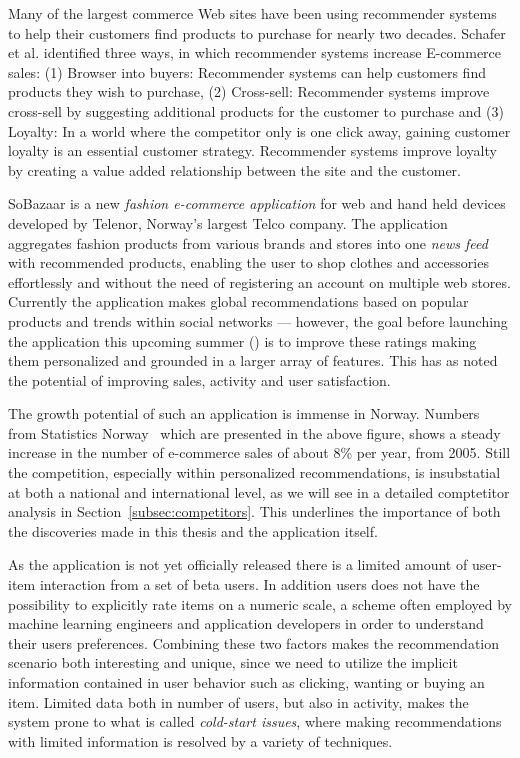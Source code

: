 Many of the largest commerce Web sites have been using recommender systems to
help their customers find products to purchase for nearly two decades.
Schafer et al. \cite{Schafer1999} identified three ways, in which recommender
systems increase E-commerce sales: (1) Browser into buyers: Recommender systems
can help customers find products they wish to purchase, (2) Cross-sell:
Recommender systems improve cross-sell by suggesting additional products for
the customer to purchase and (3) Loyalty: In a world where the competitor only
is one click away, gaining customer loyalty is an essential customer strategy.
Recommender systems improve loyalty by creating a value added relationship
between the site and the customer.

SoBazaar is a new \textit{fashion e-commerce application} for web and hand held
devices developed by Telenor, Norway's largest Telco company. The application
aggregates fashion products from various brands and stores into one \emph{news
feed} with recommended products, enabling the user to shop clothes and
accessories effortlessly and without the need of registering an account on
multiple web stores. Currently the application makes global recommendations
based on popular products and trends within social networks --- however, the goal
before launching the application this upcoming summer (\the\year) is to improve
these ratings making them personalized and grounded in a larger array of
features. This has as noted the potential of improving sales, activity and user
satisfaction.

\ecommercenorway{}

The growth potential of such an application is immense in Norway. Numbers from
Statistics Norway~\cite{statisticsNorway} which are presented in the above
figure, shows a steady increase in the number of e-commerce sales of about 8\%
per year, from 2005. Still the competition, especially within personalized
recommendations, is insubstatial at both a national and international level, as
we will see in a detailed comptetitor analysis in
Section~\ref{subsec:competitors}. This underlines the importance of both the
discoveries made in this thesis and the application itself.

As the application is not yet officially released there is a limited amount of
user-item interaction from a set of beta users. In addition users does not have
the possibility to explicitly rate items on a numeric scale, a scheme often
employed by machine learning engineers and application developers in order to
understand their users preferences. Combining these two factors makes the
recommendation scenario both interesting and unique, since we need to utilize
the implicit information contained in user behavior such as clicking, wanting
or buying an item. Limited data both in number of users, but also in activity,
makes the system prone to what is called \textit{cold-start issues}, where
making recommendations with limited information is resolved by a variety of
techniques.

